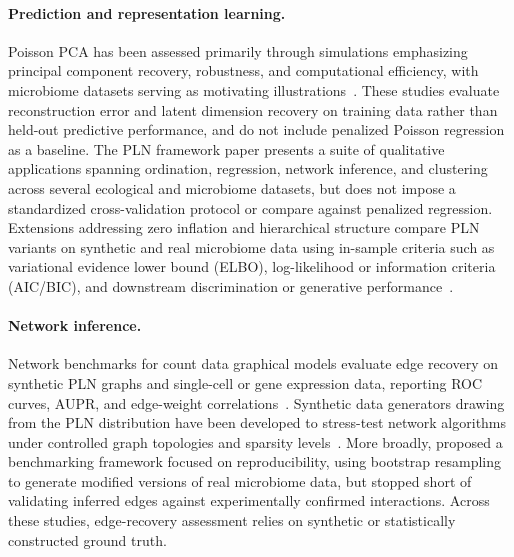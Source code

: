\documentclass[Review,doublespace,sageh,times]{sagej}
\begin{document}
\paragraph{Prediction and representation learning.}
Poisson PCA has been assessed primarily through simulations emphasizing principal component recovery, robustness, and computational efficiency, with microbiome datasets serving as motivating illustrations~\citep{Kenney2021PoissonPCA, Virta2023PoissonPCA}.
These studies evaluate reconstruction error and latent dimension recovery on training data rather than held-out predictive performance, and do not include penalized Poisson regression as a baseline.
The PLN framework paper \citep{Chiquet2021} presents a suite of qualitative applications spanning ordination, regression, network inference, and clustering across several ecological and microbiome datasets, but does not impose a standardized cross-validation protocol or compare against penalized regression.
Extensions addressing zero inflation and hierarchical structure compare PLN variants on synthetic and real microbiome data using in-sample criteria such as variational evidence lower bound (ELBO), log-likelihood or information criteria (AIC/BIC), and downstream discrimination or generative performance~\citep{Batardiere2025ZIPLN, Chaussard2025PLNTree}.

\paragraph{Network inference.}
Network benchmarks for count data graphical models evaluate edge recovery on synthetic PLN graphs and single-cell or gene expression data, reporting ROC curves, AUPR, and edge-weight correlations~\citep{Xiao2022PLNet}.
Synthetic data generators drawing from the PLN distribution have been developed to stress-test network algorithms under controlled graph topologies and sparsity levels~\citep{Qian2024}.
More broadly, \citet{Ghaeli2025} proposed a benchmarking framework focused on reproducibility, using bootstrap resampling to generate modified versions of real microbiome data, but stopped short of validating inferred edges against experimentally confirmed interactions.
Across these studies, edge-recovery assessment relies on synthetic or statistically constructed ground truth.
\end{document}
